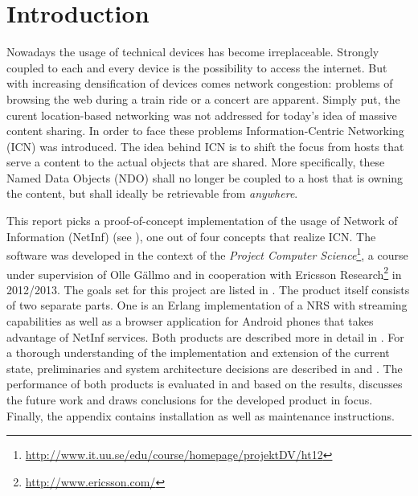 \chapter{Introduction}

Nowadays the usage of technical devices has become irreplaceable. Strongly coupled to
each and every device is the possibility to access the internet. But with increasing
densification of devices comes network congestion: problems of
browsing the web during a train ride or a concert are apparent. Simply put, the curent
location-based networking was not addressed for today's idea of massive content sharing. 
In order to face these problems Information-Centric Networking (ICN) was introduced.
The idea behind ICN is to shift the focus from hosts that serve a content to the actual objects that
are shared. More specifically, these Named Data Objects (NDO) shall no longer be coupled
to a host that is owning the content, but shall ideally be retrievable from \textit{anywhere}.

This report picks a proof-of-concept implementation of the usage of Network of Information (NetInf) 
(see ), one out of four concepts that realize ICN. The software was
developed in the context of the 
\textit{Project Computer Science}\footnote{\url{http://www.it.uu.se/edu/course/homepage/projektDV/ht12}},
a course under supervision of Olle Gällmo and in cooperation with Ericsson Research\footnote{\url{http://www.ericsson.com/}}
in 2012/2013. The goals set for this project are listed in . 
The product itself consists of two separate parts. One is an Erlang implementation of a NRS with streaming capabilities
as well as a browser application for Android phones that takes advantage of NetInf services. 
Both products are described more in detail in . For a thorough understanding
of the implementation and extension of the current state, preliminaries and system architecture decisions are 
described in  and . 
The performance of both products is evaluated in  and based on the results,
 discusses the future work and draws conclusions for the developed product
in focus. Finally, the appendix contains installation as well as maintenance instructions.